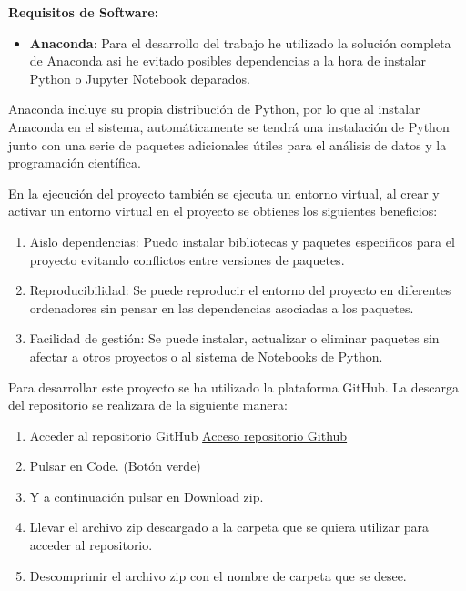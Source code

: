   
\textbf{Requisitos de Software:} 

  \begin{itemize}
   \tightlist
   \item
    \textbf{Anaconda}: Para el desarrollo del trabajo he utilizado la solución completa de Anaconda asi he evitado posibles dependencias a la hora de instalar Python o Jupyter Notebook deparados.
  \end{itemize}
  

Anaconda incluye su propia distribución de Python, por lo que al instalar Anaconda en el sistema, automáticamente se tendrá una instalación de Python junto con una serie de paquetes adicionales útiles para el análisis de datos y la programación científica.

En la ejecución del proyecto también se ejecuta un entorno virtual, al crear y activar un entorno virtual en el proyecto se obtienes los siguientes beneficios:

\begin{enumerate}
\def\labelenumi{\arabic{enumi}.}
\tightlist
\item Aislo dependencias: Puedo instalar bibliotecas y paquetes especificos para el proyecto evitando conflictos entre versiones de paquetes.

\item Reproducibilidad: Se puede reproducir el entorno del proyecto en diferentes ordenadores sin pensar en las dependencias asociadas a los paquetes.

\item Facilidad de gestión: Se puede instalar, actualizar o eliminar paquetes sin afectar a otros proyectos o al sistema de Notebooks de Python.

\end{enumerate}


Para desarrollar este proyecto se ha utilizado la plataforma GitHub.
La descarga del repositorio se realizara de la siguiente manera:

\begin{enumerate}
\def\labelenumi{\arabic{enumi}.}
\tightlist
\item Acceder al repositorio GitHub \href{https://github.com/jpg1003/GII_O_MA_23.37}{Acceso repositorio Github}
\item Pulsar en Code. (Botón verde)
\item Y a continuación pulsar en Download zip.


\item Llevar el archivo zip descargado a la carpeta que se quiera utilizar para acceder al repositorio.
\item Descomprimir el archivo zip con el nombre de carpeta que se desee.

\end{enumerate}

